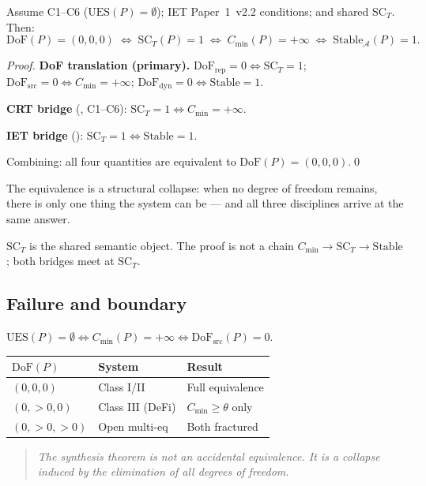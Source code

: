 \begin{theorem}\label{thm:synthesis-main}
Assume C1--C6 ($\mathrm{UES}(P)=\emptyset$); IET Paper~1~v2.2 conditions;
and shared $\mathrm{SC}_T$. Then:
$$\boxed{\mathrm{DoF}(P)=(0,0,0)
  \;\Longleftrightarrow\;
  \mathrm{SC}_T(P)=1
  \;\Longleftrightarrow\;
  C_{\min}(P)=+\infty
  \;\Longleftrightarrow\;
  \mathrm{Stable}_{\mathcal{A}}(P)=1.}$$
\end{theorem}

\begin{proof}
\textbf{DoF translation (primary).}
$\mathrm{DoF}_{\mathrm{rep}}=0\iff\mathrm{SC}_T=1$;
$\mathrm{DoF}_{\mathrm{src}}=0\iff C_{\min}=+\infty$;
$\mathrm{DoF}_{\mathrm{dyn}}=0\iff\mathrm{Stable}=1$.

\textbf{CRT bridge} (\cite{bridge-hierarchy}, C1--C6):
$\mathrm{SC}_T=1\iff C_{\min}=+\infty$.

\textbf{IET bridge} (\cite{iet-paper1}):
$\mathrm{SC}_T=1\iff\mathrm{Stable}=1$.

Combining: all four quantities are equivalent to $\mathrm{DoF}(P)=(0,0,0)$.\qed
\end{proof}

\begin{remark}
The equivalence is a structural collapse: when no degree of freedom remains,
there is only one thing the system can be --- and all three disciplines
arrive at the same answer.
\end{remark}

\begin{remark}
$\mathrm{SC}_T$ is the shared semantic object. The proof is not a chain
$C_{\min}\to\mathrm{SC}_T\to\mathrm{Stable}$; both bridges meet at $\mathrm{SC}_T$.
\end{remark}

\subsection{Failure and boundary}\label{subsec:boundary}

$\mathrm{UES}(P)=\emptyset\iff C_{\min}(P)=+\infty\iff\mathrm{DoF}_{\mathrm{src}}(P)=0$.

\begin{center}\begin{tabular}{llp{4cm}}\hline
$\mathrm{DoF}(P)$ & System & Result\\\hline
$(0,0,0)$ & Class I/II & Full equivalence\\
$(0,{>}0,0)$ & Class III (DeFi) & $C_{\min}\geq\theta$ only\\
$(0,{>}0,{>}0)$ & Open multi-eq & Both fractured\\\hline
\end{tabular}\end{center}

\begin{quote}\itshape
The synthesis theorem is not an accidental equivalence.
It is a collapse induced by the elimination of all degrees of freedom.
\end{quote}
